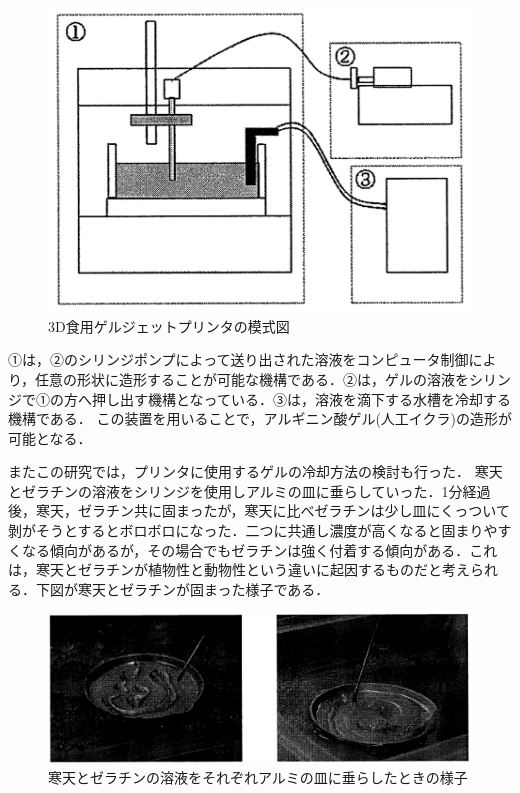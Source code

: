 \begin{figure}[H]
  \centering
  \includegraphics[width=10truecm]{./fig/geru.png}
  \caption{3D食用ゲルジェットプリンタの模式図}
  \label{fig:ferret}
\end{figure}

①は，②のシリンジポンプによって送り出された溶液をコンピュータ制御により，任意の形状に造形することが可能な機構である．②は，ゲルの溶液をシリンジで①の方へ押し出す機構となっている．③は，溶液を滴下する水槽を冷却する機構である．
この装置を用いることで，アルギニン酸ゲル(人工イクラ)の造形が可能となる．

またこの研究では，プリンタに使用するゲルの冷却方法の検討も行った．
寒天とゼラチンの溶液をシリンジを使用しアルミの皿に垂らしていった．1分経過後，寒天，ゼラチン共に固まったが，寒天に比べゼラチンは少し皿にくっついて剝がそうとするとボロボロになった．二つに共通し濃度が高くなると固まりやすくなる傾向があるが，その場合でもゼラチンは強く付着する傾向がある．これは，寒天とゼラチンが植物性と動物性という違いに起因するものだと考えられる．下図が寒天とゼラチンが固まった様子である．

\begin{figure}[H]
  \centering
  \includegraphics[width=12truecm]{./fig/geru2.png}
  \caption{寒天とゼラチンの溶液をそれぞれアルミの皿に垂らしたときの様子}
  \label{fig:ferret}
\end{figure}

